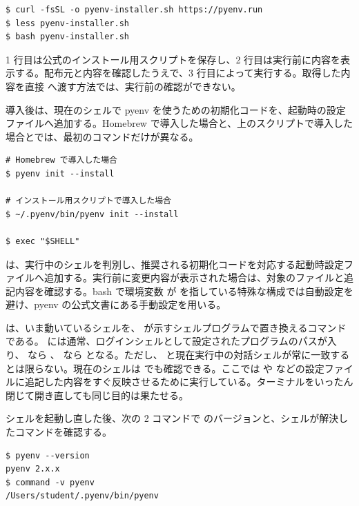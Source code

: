 \begin{lstlisting}[numbers=none, xleftmargin=2\zw]
$ curl -fsSL -o pyenv-installer.sh https://pyenv.run
$ less pyenv-installer.sh
$ bash pyenv-installer.sh
\end{lstlisting}

1 行目は公式のインストール用スクリプトを保存し、2 行目は実行前に内容を表示する。配布元と内容を確認したうえで、3 行目によって実行する。取得した内容を直接  へ渡す方法では、実行前の確認ができない。

導入後は、現在のシェルで pyenv を使うための初期化コードを、起動時の設定ファイルへ追加する。Homebrew で導入した場合と、上のスクリプトで導入した場合とでは、最初のコマンドだけが異なる。

\begin{lstlisting}[numbers=none, xleftmargin=2\zw]
# Homebrew で導入した場合
$ pyenv init --install

# インストール用スクリプトで導入した場合
$ ~/.pyenv/bin/pyenv init --install

$ exec "$SHELL"
\end{lstlisting}

 は、実行中のシェルを判別し、推奨される初期化コードを対応する起動時設定ファイルへ追加する。実行前に変更内容が表示された場合は、対象のファイルと追記内容を確認する。bash で環境変数  が  を指している特殊な構成では自動設定を避け、pyenv の公式文書にある手動設定を用いる。

 は、いま動いているシェルを、 が示すシェルプログラムで置き換えるコマンドである。 には通常、ログインシェルとして設定されたプログラムのパスが入り、 なら 、 なら  となる。ただし、 と現在実行中の対話シェルが常に一致するとは限らない。現在のシェルは  でも確認できる。ここでは  や  などの設定ファイルに追記した内容をすぐ反映させるために実行している。ターミナルをいったん閉じて開き直しても同じ目的は果たせる。

シェルを起動し直した後、次の 2 コマンドで  のバージョンと、シェルが解決したコマンドを確認する。

\begin{lstlisting}[numbers=none, xleftmargin=2\zw]
$ pyenv --version
pyenv 2.x.x
$ command -v pyenv
/Users/student/.pyenv/bin/pyenv
\end{lstlisting}


